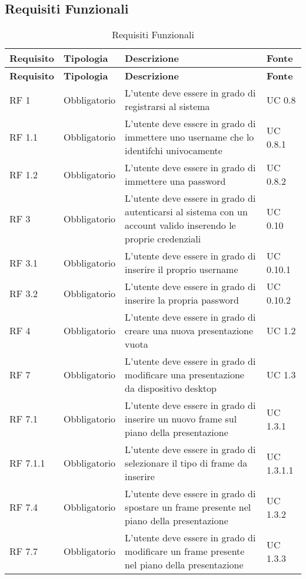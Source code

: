 \subsection{Requisiti Funzionali}{ 
\renewcommand*{\arraystretch}{1.4} 
\begin{longtable} [c]{| p{2.5cm} | p{2.5cm} | p{6cm} |p{2.5cm}|} 
\caption{Requisiti Funzionali \label{tab:reqFunzionali}}\\ \hline\textbf{Requisito} & \textbf{Tipologia} & \textbf{Descrizione} & \textbf{Fonte} \\ 
\hline \endfirsthead \hline 
\textbf{Requisito} & \textbf{Tipologia} & \textbf{Descrizione} & \textbf{Fonte} \\ 
\hline \endhead \hline \endfoot \hline \endlastfoot 
RF 1 & Obbligatorio & L’utente deve essere in grado di registrarsi al sistema & UC 0.8\\ 
 \hline 
RF 1.1 & Obbligatorio & L’utente deve essere in grado di immettere uno username che lo identifchi univocamente & UC 0.8.1\\ 
 \hline 
RF 1.2 & Obbligatorio & L'utente deve essere in grado di immettere una password & UC 0.8.2\\ 
 \hline 
RF 3 & Obbligatorio & L’utente deve essere in grado di autenticarsi al sistema con un account valido inserendo le proprie credenziali & UC 0.10\\ 
 \hline 
RF 3.1 & Obbligatorio & L'utente deve essere in grado di inserire il proprio username & UC 0.10.1\\ 
 \hline 
RF 3.2 & Obbligatorio & L'utente deve essere in grado di inserire la propria password & UC 0.10.2\\ 
 \hline 
RF 4 & Obbligatorio & L’utente deve essere in grado di creare una nuova presentazione vuota & UC 1.2\\ 
 \hline 
RF 7 & Obbligatorio & L'utente deve essere in grado di modificare una presentazione da dispositivo desktop & UC 1.3\\ 
 \hline 
RF 7.1 & Obbligatorio & L'utente deve essere in grado di inserire un nuovo frame sul piano della presentazione & UC 1.3.1\\ 
 \hline 
RF 7.1.1 & Obbligatorio & L'utente deve essere in grado di selezionare il tipo di frame da inserire & UC 1.3.1.1\\ 
 \hline 
RF 7.4 & Obbligatorio & L'utente deve essere in grado di spostare un frame presente nel piano della presentazione & UC 1.3.2\\ 
 \hline 
RF 7.7 & Obbligatorio & L'utente deve essere in grado di modificare un frame presente nel piano della presentazione & UC 1.3.3\\ 

\end{longtable}}
